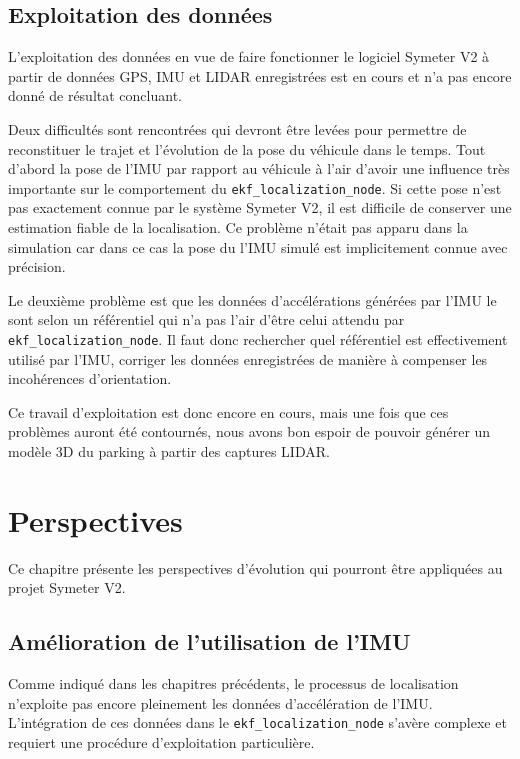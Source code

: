 \documentclass[12pt,a4paper]{report}
\begin{document}
	
	\section{Exploitation des données}
	\label{expdonnees}
	L'exploitation des données en vue de faire fonctionner le logiciel Symeter V2 à partir de données GPS, IMU et LIDAR enregistrées est en cours et n'a pas encore donné de résultat concluant.
	
	\para Deux difficultés sont rencontrées qui devront être levées pour permettre de reconstituer le trajet et l'évolution de la pose du véhicule dans le temps. Tout d'abord la pose de l'IMU par rapport au véhicule à l'air d'avoir une influence très importante sur le comportement du \verb|ekf_localization_node|. Si cette pose n'est pas exactement connue par le système Symeter V2, il est difficile de conserver une estimation fiable de la localisation. Ce problème n'était pas apparu dans la simulation car dans ce cas la pose du l'IMU simulé est implicitement connue avec précision.
	
	\para Le deuxième problème est que les données d'accélérations générées par l'IMU le sont selon un référentiel qui n'a pas l'air d'être celui attendu par \verb|ekf_localization_node|. Il faut donc rechercher quel référentiel est effectivement utilisé par l'IMU, corriger les données enregistrées de manière à compenser les incohérences d'orientation.
	
	\para Ce travail d'exploitation est donc encore en cours, mais une fois que ces problèmes auront été contournés, nous avons bon espoir de pouvoir générer un modèle 3D du parking à partir des captures LIDAR.
	 
\chapter{Perspectives}

Ce chapitre présente les perspectives d'évolution qui pourront être appliquées au projet Symeter V2. 

\section{Amélioration de l'utilisation de l'IMU}
Comme indiqué dans les chapitres précédents, le processus de localisation n'exploite pas encore pleinement les données d'accélération de l'IMU. L'intégration de ces données dans le \verb|ekf_localization_node| s'avère complexe et requiert une procédure d'exploitation particulière. 
\end{document}
